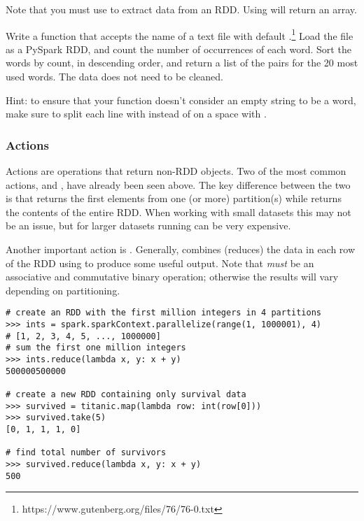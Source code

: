 \begin{warn}
Note that you must use  to extract data from an RDD. Using  will return an array.
\end{warn}

\begin{problem}
Write a function that accepts the name of a text file with default .\footnote{https://www.gutenberg.org/files/76/76-0.txt}
Load the file as a PySpark RDD, and count the number of occurrences of each word.
Sort the words by count, in descending order, and return a list of the  pairs for the 20 most used words. 
The data does not need to be cleaned.

\noindent Hint: to ensure that your function doesn't consider an empty string  to be a word, make sure to split each line with  instead of on a space with .
\label{prob:spark-rdd-hello-world}
\end{problem}

\subsubsection*{Actions}
Actions are operations that return non-RDD objects.
Two of the most common actions,  and , have already been seen above.
The key difference between the two is that  returns the first  elements from one (or more) partition(s) while  returns the contents of the entire RDD.
When working with small datasets this may not be an issue, but for larger datasets running  can be very expensive.

Another important action is . Generally,  combines (reduces) the data in each row of the RDD using  to produce some useful output. 
Note that  \textit{must} be an associative and commutative binary operation; otherwise the results will vary depending on partitioning.

\begin{lstlisting}
# create an RDD with the first million integers in 4 partitions
>>> ints = spark.sparkContext.parallelize(range(1, 1000001), 4)
# [1, 2, 3, 4, 5, ..., 1000000]
# sum the first one million integers
>>> ints.reduce(lambda x, y: x + y)
500000500000

# create a new RDD containing only survival data
>>> survived = titanic.map(lambda row: int(row[0]))
>>> survived.take(5)
[0, 1, 1, 1, 0]

# find total number of survivors
>>> survived.reduce(lambda x, y: x + y)
500
\end{lstlisting}

